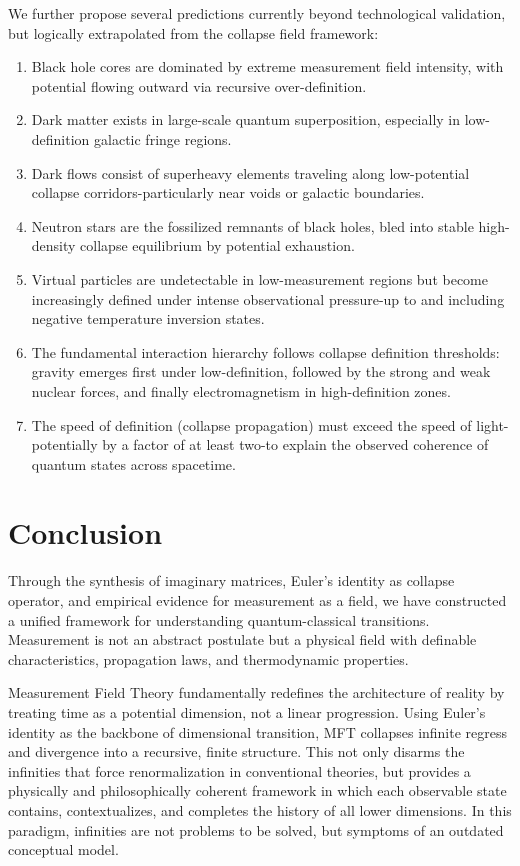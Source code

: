 We further propose several predictions currently beyond technological validation, but logically extrapolated from the collapse field framework:

\begin{enumerate}
  \item Black hole cores are dominated by extreme measurement field intensity, with potential flowing outward via recursive over-definition.
  \item Dark matter exists in large-scale quantum superposition, especially in low-definition galactic fringe regions.
  \item Dark flows consist of superheavy elements traveling along low-potential collapse corridors-particularly near voids or galactic boundaries.
  \item Neutron stars are the fossilized remnants of black holes, bled into stable high-density collapse equilibrium by potential exhaustion.
  \item Virtual particles are undetectable in low-measurement regions but become increasingly defined under intense observational pressure-up to and including negative temperature inversion states.
  \item The fundamental interaction hierarchy follows collapse definition thresholds: gravity emerges first under low-definition, followed by the strong and weak nuclear forces, and finally electromagnetism in high-definition zones.
  \item The speed of definition (collapse propagation) must exceed the speed of light-potentially by a factor of at least two-to explain the observed coherence of quantum states across spacetime.
\end{enumerate}


\section{Conclusion}

Through the synthesis of imaginary matrices, Euler's identity as collapse operator, and empirical evidence for measurement as a field, we have constructed a unified framework for understanding quantum-classical transitions. Measurement is not an abstract postulate but a physical field with definable characteristics, propagation laws, and thermodynamic properties.

Measurement Field Theory fundamentally redefines the architecture of reality by treating time as a potential dimension, not a linear progression. Using Euler's identity as the backbone of dimensional transition, MFT collapses infinite regress and divergence into a recursive, finite structure. This not only disarms the infinities that force renormalization in conventional theories, but provides a physically and philosophically coherent framework in which each observable state contains, contextualizes, and completes the history of all lower dimensions. In this paradigm, infinities are not problems to be solved, but symptoms of an outdated conceptual model.


